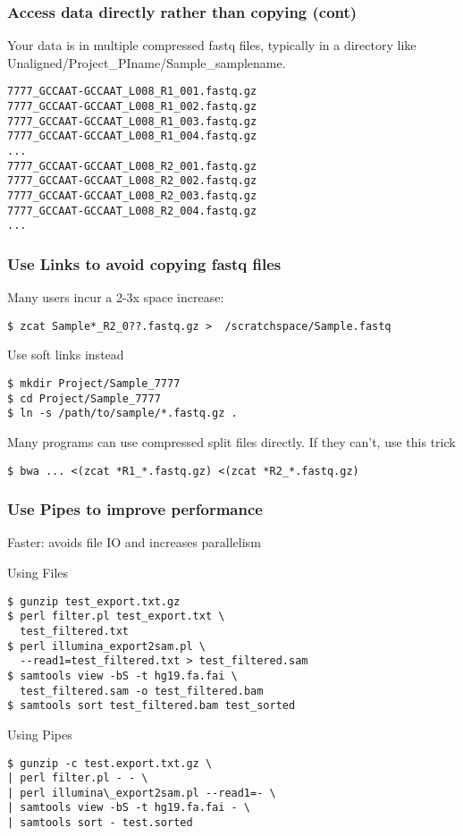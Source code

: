 \documentclass[10pt]{beamer}
\begin{document}
\begin{frame}[fragile]
\frametitle{Access data directly rather than copying (cont)}

Your data is in multiple compressed fastq files, typically in a directory
like Unaligned/Project\_PIname/Sample\_samplename.  

\begin{verbatim}
7777_GCCAAT-GCCAAT_L008_R1_001.fastq.gz
7777_GCCAAT-GCCAAT_L008_R1_002.fastq.gz
7777_GCCAAT-GCCAAT_L008_R1_003.fastq.gz
7777_GCCAAT-GCCAAT_L008_R1_004.fastq.gz
...
7777_GCCAAT-GCCAAT_L008_R2_001.fastq.gz
7777_GCCAAT-GCCAAT_L008_R2_002.fastq.gz
7777_GCCAAT-GCCAAT_L008_R2_003.fastq.gz
7777_GCCAAT-GCCAAT_L008_R2_004.fastq.gz
...
\end{verbatim}
\end{frame}


\begin{frame}[fragile]
\frametitle{Use Links to avoid copying fastq files}
Many users incur a 2-3x space increase:

\begin{verbatim}
$ zcat Sample*_R2_0??.fastq.gz >  /scratchspace/Sample.fastq
\end{verbatim}

Use soft links instead
\begin{verbatim}
$ mkdir Project/Sample_7777
$ cd Project/Sample_7777
$ ln -s /path/to/sample/*.fastq.gz .
\end{verbatim}

Many programs can use compressed split files directly.  If they can't, use this trick
\begin{verbatim}
$ bwa ... <(zcat *R1_*.fastq.gz) <(zcat *R2_*.fastq.gz) 
\end{verbatim}
\end{frame}

\begin{frame}[fragile]
\frametitle{Use Pipes to improve performance}

\vskip10pt
Faster: avoids file IO and increases parallelism

\vskip10pt
Using Files
\begin{verbatim}
$ gunzip test_export.txt.gz 
$ perl filter.pl test_export.txt \
  test_filtered.txt
$ perl illumina_export2sam.pl \
  --read1=test_filtered.txt > test_filtered.sam
$ samtools view -bS -t hg19.fa.fai \
  test_filtered.sam -o test_filtered.bam
$ samtools sort test_filtered.bam test_sorted
\end{verbatim}

Using Pipes
\begin{verbatim}
$ gunzip -c test.export.txt.gz \
| perl filter.pl - - \
| perl illumina\_export2sam.pl --read1=- \
| samtools view -bS -t hg19.fa.fai - \
| samtools sort - test.sorted
\end{verbatim}
\end{frame}
\end{document}
